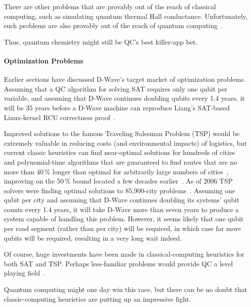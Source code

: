 There are other problems that are provably out of the reach of
classical computing, such as simulating quantum thermal Hall conductance.
Unfortunately, such problems are also provably out of the reach of
quantum computing~\cite{ZoharRingel2017QuantizedGravityHall,RichardChirwin2017ThermalHallConductance}.

Thus, quantum chemistry might still be QC's best killer-app bet.

\paragraph{Optimization Problems}
\label{sec:future:Optimization Problems}

Earlier sections have discussed D-Wave's target market of optimization
problems.
Assuming that a QC algorithm for solving SAT requires only one qubit
per variable, and assuming that D-Wave continues doubling qubits every
1.4 years, it will be 35 years before a D-Wave machine can reproduce
Liang's SAT-based Linux-kernel RCU correctness
proof~\cite{LihaoLiang2016VerifyTreeRCU}.

Improved solutions to the famous Traveling Salesman Problem (TSP) would
be extremely valuable in reducing costs (and environmental impacts)
of logistics, but current classic heuristics can find near-optimal
solutions for hundreds of cities~\cite{Martin:1992:LMC:2307953.2308141}
and polynomial-time algorithms that are guaranteed to find routes
that are no more than 40\,\% longer than optimal for arbitrarily
large numbers of cities~\cite{Sebo:2014:STN:2688265.2688281},
improving on the 50\,\% bound located a few decades
earlier~\cite{NicosChristofides1976TSP-FiftyPercent}.
As of 2006 TSP solvers were finding optimal solutions to
85,900-city problems~\cite{DLApplegate2007TSPtextbook}.
Assuming one qubit per city and assuming that D-Wave continues doubling
its systems' qubit counts every 1.4 years, it will take D-Wave more than seven
years to produce a system capable of handling this problem.
However, it seems likely that one qubit per road segment (rather than per city)
will be required, in which case far more qubits will be required,
resulting in a very long wait indeed.

Of course, huge investments have been made in classical-computing
heuristics for both SAT and TSP.
Perhaps less-familiar problems would provide QC a level
playing field~\cite{JohnPreskill2018NISQ}.

Quantum computing might one day win this race, but there can be no doubt that
classic-computing heuristics are putting up an impressive fight.

